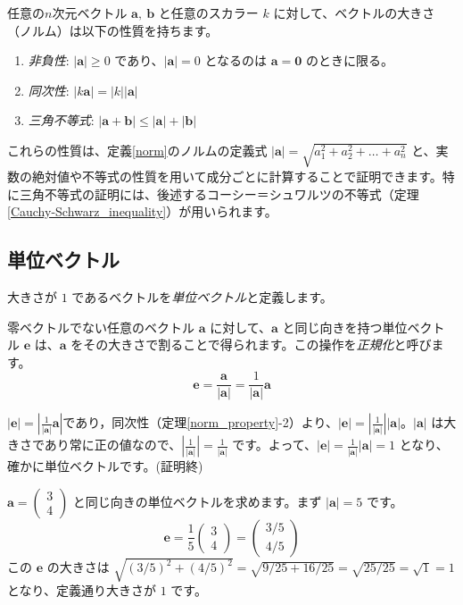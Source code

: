 \begin{thm}[ノルムの性質] \label{norm_property}
任意の$n$次元ベクトル $\bm{a},\ \bm{b}$ と任意のスカラー $k$ に対して、ベクトルの大きさ（ノルム）は以下の性質を持ちます。
\begin{enumerate}
\item \emph{非負性}: $|\bm{a}| \ge 0$ であり、$|\bm{a}| = 0$ となるのは $\bm{a} = \bm{0}$ のときに限る。
\item \emph{同次性}: $|k\bm{a}| = |k||\bm{a}|$
\item \emph{三角不等式}: $|\bm{a} + \bm{b}| \le |\bm{a}| + |\bm{b}|$
\end{enumerate}
\begin{proof*}[アイデア]
これらの性質は、定義\ref{norm}のノルムの定義式 $|\bm{a}| = \sqrt{a_1^2 + a_2^2 + \dots + a_n^2}$ と、実数の絶対値や不等式の性質を用いて成分ごとに計算することで証明できます。特に三角不等式の証明には、後述するコーシー＝シュワルツの不等式（定理\ref{Cauchy-Schwarz_inequality}）が用いられます。
\end{proof*}
\end{thm}

\subsection{単位ベクトル}

\begin{dfn}[単位ベクトル] \label{unit_vector}
大きさが $1$ であるベクトルを\emph{単位ベクトル}と定義します。
\end{dfn}

\begin{thm}[単位ベクトルの正規化] \label{vector_normalization}
零ベクトルでない任意のベクトル $\bm{a}$ に対して、$\bm{a}$ と同じ向きを持つ単位ベクトル $\bm{e}$ は、$\bm{a}$ をその大きさで割ることで得られます。この操作を\emph{正規化}と呼びます。
\[\bm{e} = \frac{\bm{a}}{|\bm{a}|} = \frac{1}{|\bm{a}|} \bm{a}\]
\begin{proof*}
$|\bm{e}| = \left| \frac{1}{|\bm{a}|} \bm{a} \right|$であり，同次性（定理\ref{norm_property}-2）より、$|\bm{e}| = \left| \frac{1}{|\bm{a}|} \right| |\bm{a}|$。$|\bm{a}|$ は大きさであり常に正の値なので、$\left|\frac{1}{|\bm{a}|}\right| = \frac{1}{|\bm{a}|}$ です。よって、$|\bm{e}| = \frac{1}{|\bm{a}|} |\bm{a}| = 1$ となり、確かに単位ベクトルです。(証明終)
\end{proof*}
\end{thm}

\begin{ex}
$\bm{a} = \begin{pmatrix} 3 \\ 4 \end{pmatrix}$ と同じ向きの単位ベクトルを求めます。まず $|\bm{a}| = 5$ です。
\[\bm{e} = \frac{1}{5} \begin{pmatrix} 3 \\ 4 \end{pmatrix} = \begin{pmatrix} 3/5 \\ 4/5 \end{pmatrix}\]
この $\bm{e}$ の大きさは $\sqrt{(3/5)^2 + (4/5)^2} = \sqrt{9/25 + 16/25} = \sqrt{25/25} = \sqrt{1} = 1$ となり、定義通り大きさが $1$ です。
\end{ex}


